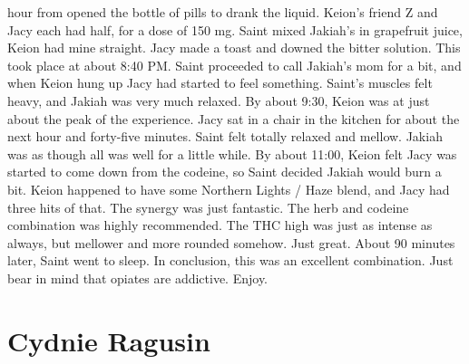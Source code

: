 \documentclass[12pt]{book}
\begin{document}
hour from opened the bottle of pills to drank the liquid. Keion's friend Z and Jacy each had half, for a dose of 150 mg. Saint mixed Jakiah's in grapefruit juice, Keion had mine straight. Jacy made a toast and downed the bitter solution. This took place at about 8:40 PM. Saint proceeded to call Jakiah's mom for a bit, and when Keion hung up Jacy had started to feel something. Saint's muscles felt heavy, and Jakiah was very much relaxed. By about 9:30, Keion was at just about the peak of the experience. Jacy sat in a chair in the kitchen for about the next hour and forty-five minutes. Saint felt totally relaxed and mellow. Jakiah was as though all was well for a little while. By about 11:00, Keion felt Jacy was started to come down from the codeine, so Saint decided Jakiah would burn a bit. Keion happened to have some Northern Lights / Haze blend, and Jacy had three hits of that. The synergy was just fantastic. The herb and codeine combination was highly recommended. The THC high was just as intense as always, but mellower and more rounded somehow. Just great. About 90 minutes later, Saint went to sleep. In conclusion, this was an excellent combination. Just bear in mind that opiates are addictive. Enjoy.



\chapter{Cydnie Ragusin}
\end{document}
